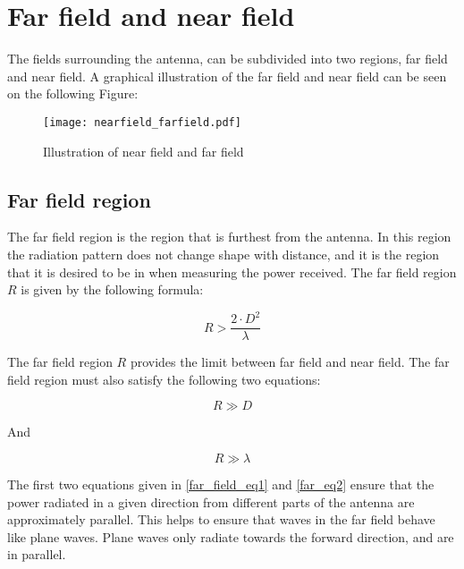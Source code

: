 \chapter{Far field and near field}
The fields surrounding the antenna, can be subdivided into two regions, far field and near field. A graphical illustration of the far field and near field \citep{farnear_field1}\citep{farnear_field2} can be seen on the following Figure:

\begin{figure}[H]
\centering
\texttt{[image: nearfield\_farfield.pdf]}
\caption{Illustration of near field and far field \citep{farnear_field}}
\label{para_wave}
\end{figure}



\section{Far field region}

The far field region is the region that is furthest from the antenna. In this region the radiation pattern does not change shape with distance, and it is the region that it is desired to be in when measuring the power received. The far field region $R$ is given by the following formula:

\begin{equation}
R > \frac{2 \cdot D^{2}}{\lambda}
\label{far_field_eq1}
\end{equation}

\begin{where}
\end{where}

The far field region $R$ provides the limit between far field and near field. The far field region must also satisfy the following two equations:

\begin{equation}
R \gg D
\label{far_eq2}
\end{equation}

And

\begin{equation}
R \gg \lambda
\label{far_eq_3}
\end{equation}

The first two equations given in \ref{far_field_eq1} and \ref{far_eq2} ensure that the power radiated in a given direction from different parts of the antenna are approximately parallel. This helps to ensure that waves in the far field behave like plane waves. Plane waves only radiate towards the forward direction, and are in parallel. %

